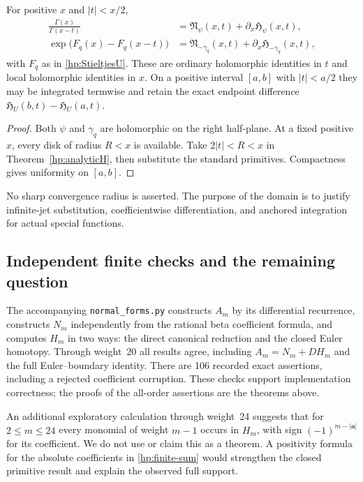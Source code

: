 \begin{corollary}
\label{hp:specialtranslations}
For positive $x$ and $|t|<x/2$,
\begin{align}
 \frac{\Gamma(x)}{\Gamma(x-t)}
     &=\mathfrak N_{\psi}(x,t)
                         +\partial_x\mathfrak H_{\psi}(x,t),
                                                    \label{hp:Gammatrans}\\
 \exp\bigl(F_q(x)-F_q(x-t)\bigr)
     &=\mathfrak N_{-\gamma_q}(x,t)
                         +\partial_x\mathfrak H_{-\gamma_q}(x,t),
                                                    \label{hp:Stieltjestrans}
\end{align}
with $F_q$ as in \eqref{hp:StieltjesU}. These are ordinary
holomorphic identities in $t$ and local holomorphic identities in $x$.
On a positive interval $[a,b]$ with $|t|<a/2$ they may be
integrated termwise and retain the exact endpoint difference
$\mathfrak H_U(b,t)-\mathfrak H_U(a,t)$.
\end{corollary}

\begin{proof}
Both $\psi$ and $\gamma_q$ are holomorphic on the right half-plane.
At a fixed positive $x$, every disk of radius $R<x$ is available.
Take $2|t|<R<x$ in Theorem~\ref{hp:analyticH}, then substitute
the standard primitives. Compactness gives uniformity on $[a,b]$.
\end{proof}

No sharp convergence radius is asserted. The purpose of the domain is
to justify infinite-jet substitution, coefficientwise differentiation,
and anchored integration for actual special functions.

\subsection{Independent finite checks and the remaining question}

The accompanying \texttt{normal\_forms.py} constructs $A_m$ by
its differential recurrence, constructs $N_m$ independently from
the rational beta coefficient formula, and computes $H_m$ in two
ways: the direct canonical reduction and the closed Euler homotopy.
Through weight~20 all results agree, including $A_m=N_m+DH_m$
and the full Euler--boundary identity. There are 106 recorded
exact assertions, including a rejected coefficient corruption.
These checks support implementation correctness; the proofs of
the all-order assertions are the theorems above.

An additional exploratory calculation through weight~24 suggests
that for $2\le m\le24$ every monomial of weight $m-1$ occurs in
$H_m$, with sign
$(-1)^{m-|\boldsymbol a|}$ for its coefficient. We do not use or
claim this as a theorem. A positivity formula for the absolute
coefficients in \eqref{hp:finite-sum} would strengthen the
closed primitive result and explain the observed full support.
